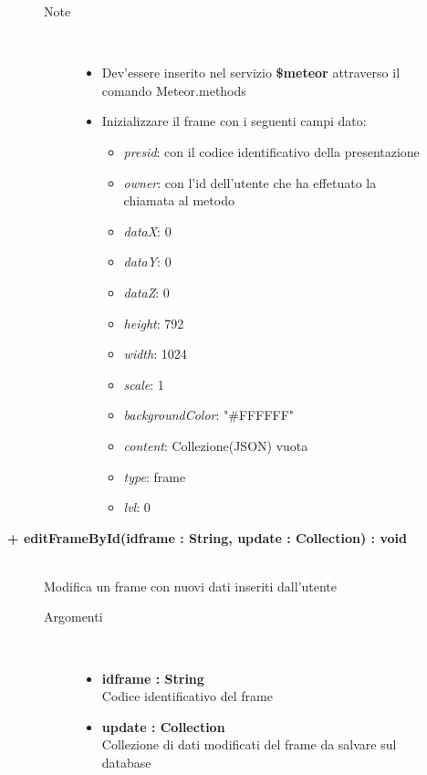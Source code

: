 \begin{description}
\begin{description}
\begin{description}
\begin{itemize}
				\end{itemize}
			\item[Note] \hfill \\
			\begin{itemize}
					\item Dev'essere inserito nel servizio \textbf{\$meteor} attraverso il comando Meteor.methods
					\item Inizializzare il frame con i seguenti campi dato:
					\begin{itemize}
					\item \textit{presid}: con il codice identificativo della presentazione
					\item \textit{owner}: con l'id dell'utente che ha effetuato la chiamata al metodo
					\item \textit{dataX}: 0
					\item \textit{dataY}: 0
					\item \textit{dataZ}: 0
					\item \textit{height}: 792
					\item \textit{width}: 1024
					\item \textit{scale}: 1
					\item \textit{backgroundColor}: "\#FFFFFF"
					\item \textit{content}: Collezione(JSON) vuota
					\item \textit{type}: frame
					\item \textit{lvl}: 0
					\end{itemize}
				\end{itemize}
		\end{description}
	\end{description}
	
	\begin{description}
		\item[\textbf{\color{blue}+ editFrameById(idframe : String, update : Collection) : void			}] \hfill \\
			Modifica un frame con nuovi dati inseriti dall'utente
			
		\begin{description}
			\item[Argomenti] \hfill \\
				\begin{itemize}
				
					\item \textbf{idframe : String			} \hfill \\
					Codice identificativo del frame
					\item \textbf{update : Collection		} \hfill \\
					Collezione di dati modificati del frame da salvare sul database
					

\end{itemize}
\end{description}
\end{description}
\end{description}
